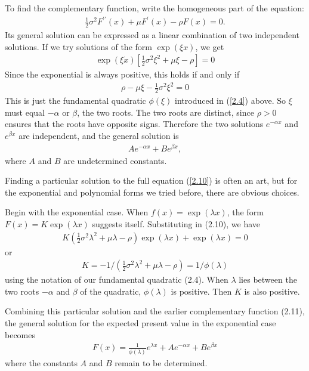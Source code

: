 \documentclass[12pt]{article}
\theoremstyle{definition}
\begin{document}
To find the complementary function, write the homogeneous part of the equation:
\begin{align*}
\frac{1}{2} \sigma^{2} F^{\prime \prime}(x)+\mu F^{\prime}(x)-\rho F(x)=0 .
\end{align*}
Its general solution can be expressed as a linear combination of two independent solutions. If we try solutions of the form $\exp (\xi x)$, we get
\begin{align*}
\exp (\xi \dot{x})\left[\frac{1}{2} \sigma^{2} \xi^{2}+\mu \xi-\rho\right]=0
\end{align*}
Since the exponential is always positive, this holds if and only if
\begin{align*}
\rho-\mu \xi-\frac{1}{2} \sigma^{2} \xi^{2}=0
\end{align*}
This is just the fundamental quadratic $\phi(\xi)$ introduced in (\ref{2.4}) above. So $\xi$ must equal $-\alpha$ or $\beta$, the two roots. The two roots are distinct, since $\rho>0$ ensures that the roots have opposite signs. Therefore the two solutions $e^{-\alpha x}$ and $e^{\beta x}$ are independent, and the general solution is
\begin{align}
A e^{-\alpha x}+B e^{\beta x}, \label{2.11}
\end{align}
where $A$ and $B$ are undetermined constants.

Finding a particular solution to the full equation (\ref{2.10}) is often an art, but for the exponential and polynomial forms we tried before, there are obvious choices.

Begin with the exponential case. When $f(x)=\exp (\lambda x)$, the form $F(x)=K \exp (\lambda x)$ suggests itself. Substituting in (2.10), we have
\begin{align*}
K\left(\frac{1}{2} \sigma^{2} \lambda^{2}+\mu \lambda-\rho\right) \exp (\lambda x)+\exp (\lambda x)=0
\end{align*}
or
\begin{align*}
K=-1 /\left(\frac{1}{2} \sigma^{2} \lambda^{2}+\mu \lambda-\rho\right)=1 / \phi(\lambda)
\end{align*}
using the notation of our fundamental quadratic (2.4). When $\lambda$ lies between the two roots $-\alpha$ and $\beta$ of the quadratic, $\phi(\lambda)$ is positive. Then $K$ is also positive.

Combining this particular solution and the earlier complementary function (2.11), the general solution for the expected present value in the exponential case becomes
\begin{align}
F(x)=\frac{1}{\phi(\lambda)} e^{\lambda x}+A e^{-\alpha x}+B e^{\beta x} \label{2.12}
\end{align}
where the constants $A$ and $B$ remain to be determined.
\end{document}
